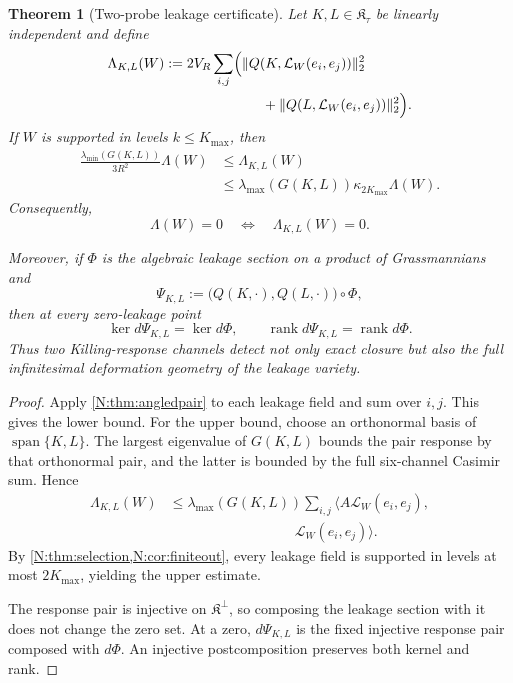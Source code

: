 \documentclass[
 aps,
 prd,
 reprint,
 amsmath,
 amssymb,
 nofootinbib,
 superscriptaddress
]{revtex4-2}
\newtheorem{theorem}{Theorem}[section]
\theoremstyle{definition}
\theoremstyle{remark}
\begin{document}
\begin{theorem}[Two-probe leakage certificate]
\label{N:thm:leakcertificate}
Let \(K,L\in\mathfrak K_\tau\) be linearly independent and define
\begin{align}
 \Lambda_{K,L}(W)
 &:=
 2V_R\sum_{i,j}
 \Bigl(
 \|Q(K,\mathcal L_W(e_i,e_j))\|_2^2
 \notag\\
 &\hspace{7em}
 +\|Q(L,\mathcal L_W(e_i,e_j))\|_2^2
 \Bigr).
 \label{N:eq:observedleak}
\end{align}
If \(W\) is supported in levels \(k\le K_{\max}\), then
\begin{equation}
\begin{aligned}
 \frac{\lambda_{\min}(G(K,L))}{3R^2}\Lambda(W)
 &\le
 \Lambda_{K,L}(W)\\
 &\le
 \lambda_{\max}(G(K,L))
 \kappa_{2K_{\max}}\Lambda(W).
\end{aligned}
\label{N:eq:leakequiv}
\end{equation}
Consequently,
\begin{equation}
 \boxed{
 \Lambda(W)=0
 \quad\Longleftrightarrow\quad
 \Lambda_{K,L}(W)=0.
 }
 \label{N:eq:leakzeroequiv}
\end{equation}

Moreover, if \(\Phi\) is the algebraic leakage section on a product of
Grassmannians and
\[
 \Psi_{K,L}
 :=
 \bigl(Q(K,\cdot),Q(L,\cdot)\bigr)\circ\Phi,
\]
then at every zero-leakage point
\begin{equation}
 \boxed{
 \ker d\Psi_{K,L}=\ker d\Phi,
 \qquad
 \operatorname{rank}d\Psi_{K,L}
 =
 \operatorname{rank}d\Phi.
 }
 \label{N:eq:tangentvisible}
\end{equation}
Thus two Killing-response channels detect not only exact closure but also
the full infinitesimal deformation geometry of the leakage variety.
\end{theorem}

\begin{proof}
Apply \cref{N:thm:angledpair} to each leakage field and sum over \(i,j\).
This gives the lower bound.  For the upper bound, choose an orthonormal basis
of \(\operatorname{span}\{K,L\}\).  The largest eigenvalue of \(G(K,L)\)
bounds the pair response by that orthonormal pair, and the latter is bounded
by the full six-channel Casimir sum.  Hence
\[
\begin{aligned}
 \Lambda_{K,L}(W)
 &\le
 \lambda_{\max}(G(K,L))
 \sum_{i,j}
 \bigl\langle
 A\mathcal L_W(e_i,e_j),\\
 &\hspace{9em}
 \mathcal L_W(e_i,e_j)
 \bigr\rangle.
\end{aligned}
\]
By \cref{N:thm:selection,N:cor:finiteout}, every leakage field is supported
in levels at most \(2K_{\max}\), yielding the upper estimate.

The response pair is injective on \(\mathfrak K^\perp\), so composing the
leakage section with it does not change the zero set.  At a zero,
\(d\Psi_{K,L}\) is the fixed injective response pair composed with \(d\Phi\).
An injective postcomposition preserves both kernel and rank.
\end{proof}
\end{document}
